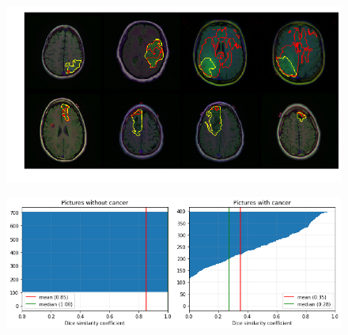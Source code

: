 \begin{figure}[h!]
    \centering
    \includegraphics[width=1.0\textwidth]{images/simcnn_mask}
    \caption{}
    \label{fig:simcnn_mask}
\end{figure}

\begin{figure}[h!]
    \centering
    \includegraphics[width=1.0\textwidth]{images/simcnn_dsc}
    \caption{}
    \label{fig:simcnn_dsc}
\end{figure}



